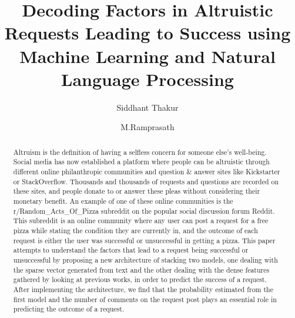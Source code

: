 \documentclass[runningheads]{llncs}
\begin{document}
%
\title{Decoding Factors in Altruistic Requests Leading to Success using Machine Learning and Natural Language Processing}
%
%
\author{Siddhant Thakur \and
M.Ramprasath}
%
%
%
\maketitle              %
%
\begin{abstract}
Altruism is the definition of having a selfless concern for someone else’s well-being. Social media has now established a platform where people can be altruistic through different online philanthropic communities and question \& answer sites like Kickstarter or StackOverflow. Thousands and thousands of requests and questions are recorded on these sites, and people donate to or answer these pleas without considering their monetary benefit. An example of one of these online communities is the r/Random\_Acts\_Of\_Pizza subreddit on the popular social discussion forum Reddit. This subreddit is an online community where any user can post a request for a free pizza while stating the condition they are currently in, and the outcome of each request is either the user was successful or unsuccessful in getting a pizza. This paper attempts to understand the factors that lead to a request being successful or unsuccessful by proposing a new architecture of stacking two models, one dealing with the sparse vector generated from text and the other dealing with the dense features gathered by looking at previous works, in order to predict the success of a request. After implementing the architecture, we find that the probability estimated from the first model and the number of comments on the request post plays an essential role in predicting the outcome of a request.


\end{abstract}
%
%
%
\end{document}
